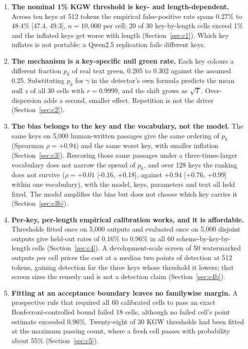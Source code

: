 \documentclass[conference]{IEEEtran}
\begin{document}
\begin{enumerate}
  \item \textbf{The nominal 1\% KGW threshold is key- and length-dependent.}
  Across ten keys at 512 tokens the empirical false-positive rate spans 0.27\% to
  48.4\% [47.4, 49.3], $n=10{,}000$ per cell; 20 of 30 key-by-length cells exceed
  1\% and the inflated keys get worse with length (Section~\ref{sec:c1}). Which
  key inflates is not portable: a Qwen2.5 replication fails different keys.
  \item \textbf{The mechanism is a key-specific null green rate.} Each key colours
  a different fraction $p_k$ of real text green, 0.205 to 0.302 against the assumed
  0.25. Substituting $p_k$ for $\gamma$ in the detector's own formula predicts the
  mean null $z$ of all 30 cells with $r=0.9999$, and the shift grows as $\sqrt{T}$.
  Over-dispersion adds a second, smaller effect. Repetition is not the driver
  (Section~\ref{sec:c2}).
  \item \textbf{The bias belongs to the key and the vocabulary, not the model.}
  The same keys on 5,000 human-written passages give the same ordering of $p_k$
  (Spearman $\rho=+0.94$) and the same worst key, with smaller inflation
  (Section~\ref{sec:c3}). Rescoring those same passages under a three-times-larger
  vocabulary does not narrow the spread of $p_k$, and over 128 keys the ranking
  does not survive ($\rho=+0.01$ [-0.16, +0.18], against
  $+0.94$ [+0.76, +0.99] within one vocabulary), with the model, keys, parameters
  and text all held fixed. The model amplifies the bias but does not choose which key carries it
  (Section~\ref{sec:c3b}).
  \item \textbf{Per-key, per-length empirical calibration works, and it is
  affordable.} Thresholds fitted once on 5,000 outputs and evaluated once on
  5,000 disjoint outputs give held-out rates of 0.16\% to 0.96\% in all 60
  scheme-by-key-by-length cells (Section~\ref{sec:c4}). A development-scale screen
  of 50 watermarked outputs per cell prices the cost at a median two points of
  detection at 512 tokens, gaining detection for the three keys whose threshold it
  lowers; that screen sizes the remedy and is not a detection claim
  (Section~\ref{sec:c4b}).
  \item \textbf{Fitting at an acceptance boundary leaves no familywise margin.} A
  prospective rule that required all 60 calibrated cells to pass an exact
  Bonferroni-controlled bound failed 18 cells, although no failed cell's point
  estimate exceeded 0.96\%. Twenty-eight of 30 KGW thresholds had been fitted at
  the maximum passing count, where a fresh cell passes with probability about
  55\% (Section~\ref{sec:c5}).
\end{enumerate}
\end{document}
